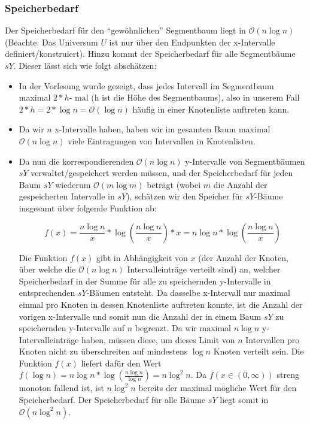 \documentclass[a4paper]{article}
\begin{document}
\subsubsection*{Speicherbedarf}
Der Speicherbedarf für den "`gewöhnlichen"' Segmentbaum liegt  in $\mathcal{O}(n \log n)$ (Beachte: Das Universum $U$ ist nur über den Endpunkten der x-Intervalle
definiert/konstruiert). Hinzu kommt der Speicherbedarf für alle Segmentbäume $sY$.
Dieser lässt sich wie folgt abschätzen:

\begin{itemize}
	\item In der Vorlesung wurde gezeigt, dass jedes Intervall im Segmentbaum maximal $2 * h$- mal (h ist die Höhe des Segmentbaums), also in unserem Fall $2 * h = 2 * \log n 
	= \mathcal{O}(\log n)$ häufig in einer Knotenliste auftreten kann.
	\item Da wir $n$ x-Intervalle haben, haben wir im gesamten Baum maximal $\mathcal{O}(n \log n)$ viele
	Eintragungen von Intervallen in Knotenlisten.
	\item Da nun die korrespondierenden $\mathcal{O}(n \log n)$ y-Intervalle von Segmentbäumen $sY$ verwaltet/gespeichert werden 	
	müssen, und der Speicherbedarf für jeden Baum $sY$ wiederum $\mathcal{O}(m \log m)$ beträgt (wobei $m$
	die Anzahl der gespeicherten Intervalle in $sY$), schätzen wir den Speicher für $sY$-Bäume insgesamt über folgende 
	Funktion ab:
	
	$$f(x) = \frac{n \log n}{x} * \log(\frac{n \log n}{x}) * x = n \log n * \log(\frac{n \log n}{x})$$
	
	Die Funktion $f(x)$ gibt in Abhängigkeit von $x$ (der Anzahl der Knoten, über welche die $\mathcal{O}(n \log n)$ Intervalleinträge verteilt sind) an, welcher Speicherbedarf in der Summe für alle zu speichernden
	y-Intervalle in entsprechenden $sY$-Bäumen entsteht. Da dasselbe x-Intervall nur maximal einmal
	pro Knoten in dessen Knotenliste auftreten konnte, ist die Anzahl der vorigen x-Intervalle und somit nun die Anzahl der in einem Baum $sY$ zu speichernden y-Intervalle auf $n$ begrenzt. Da wir maximal $n \log n$ y-Intervalleinträge haben, müssen diese, um 
	dieses Limit von $n$ Intervallen pro Knoten nicht zu überschreiten auf mindestens $\log n$ Knoten verteilt sein. Die Funktion $f(x)$ liefert dafür den Wert $f(\log n) = n \log n * \log(\frac{n \log n}{\log n}) =
	n \log^2 n$. Da $f(x \in (0, \infty))$ streng monoton fallend ist, ist $n \log^2 n$ bereits der 
	maximal mögliche Wert für den Speicherbedarf. Der Speicherbedarf für alle Bäume $sY$ liegt somit
	in $\mathcal{O}( n \log^2 n)$.
	
\end{itemize}
\end{document}
